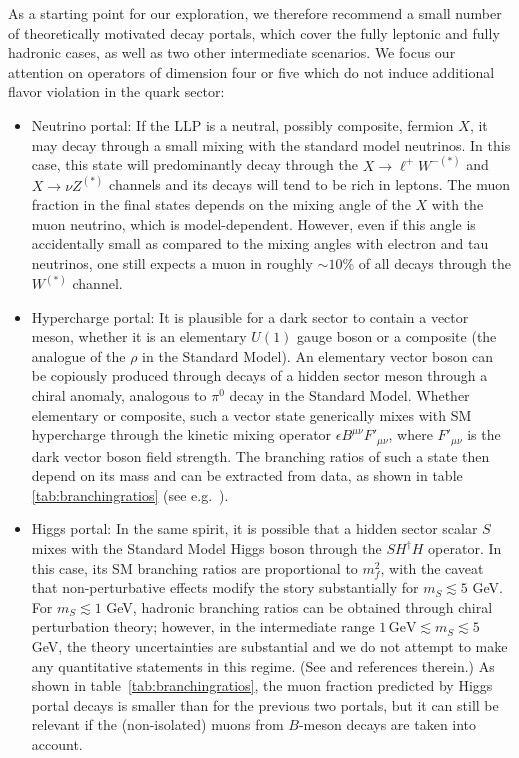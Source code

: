 As a starting point for our exploration, we therefore recommend a small number of theoretically motivated decay portals, which cover the fully leptonic and fully hadronic cases, as well as two other intermediate scenarios. We focus our attention on operators of dimension four or five which do not induce additional flavor violation in the quark sector:

\begin{itemize}
\item Neutrino portal: If the LLP is a neutral, possibly composite, fermion $X$, it may decay through a small mixing with the standard model neutrinos. In this case, this state will predominantly decay through the $X\to \ell^+ W^{-(\ast)}$ and $X\to \nu Z^{(\ast)}$ channels and its decays will tend to be rich in leptons. The muon fraction in the final states depends on the mixing angle of the $X$ with the muon neutrino, which is model-dependent. However, even if this angle is accidentally small as compared to the mixing angles with electron and tau neutrinos, one still expects a muon in roughly $\sim10\%$ of all decays through the $W^{(\ast)}$ channel.
 
\item Hypercharge portal: It is plausible for a dark sector to contain a vector meson, whether it is an elementary $U(1)$ gauge boson or a composite (the analogue of the $\rho$ in the Standard Model). An elementary vector boson can be  copiously produced through decays of a hidden sector meson through a chiral anomaly, analogous to $\pi^0$ decay in the Standard Model.  Whether elementary or composite, such a vector state generically mixes with SM hypercharge through the kinetic mixing operator $\epsilon B^{\mu\nu}F'_{\mu\nu}$, where $F'_{\mu\nu}$ is the dark vector boson field strength.  The branching ratios of such a state then depend on its mass and can be extracted from data, as shown in table \ref{tab:branchingratios} (see e.g.~\cite{Meade:2009rb, Curtin:2014cca}). 

\item Higgs portal: In the same spirit, it is possible that a hidden sector scalar $S$ mixes with the Standard Model Higgs boson through the $S H^\dagger H$ operator. In this case, its SM branching ratios are proportional to $m_f^2$, with the caveat that non-perturbative effects modify the story substantially for $m_S\lesssim 5$ GeV. For $m_S\lesssim 1$ GeV, hadronic branching ratios can be obtained through chiral perturbation theory; however, in the intermediate range  $1\, \mathrm{GeV} \lesssim m_S \lesssim 5$ GeV, the theory uncertainties are substantial and we do not attempt to make any quantitative statements in this regime. (See \cite{Clarke:2013aya} and references therein.) As shown in table~\ref{tab:branchingratios}, the muon fraction predicted by Higgs portal decays is smaller than for the previous two portals, but it can still be relevant if the (non-isolated) muons from $B$-meson decays are taken into account. 


\end{itemize}
